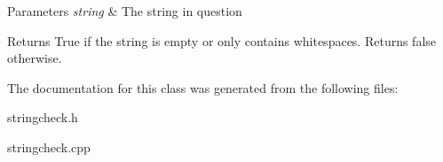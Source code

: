 \begin{DoxyParams}{Parameters}
{\em string} & The string in question \\
\hline
\end{DoxyParams}
\begin{DoxyReturn}{Returns}
True if the string is empty or only contains whitespaces. Returns false otherwise. 
\end{DoxyReturn}


The documentation for this class was generated from the following files\+:\begin{DoxyCompactItemize}
\item 
stringcheck.\+h\item 
stringcheck.\+cpp\end{DoxyCompactItemize}
